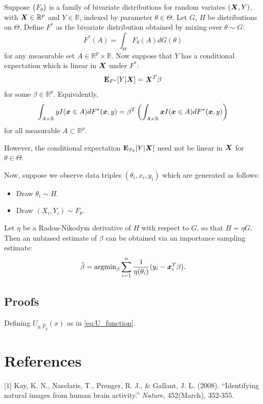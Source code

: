 \documentclass[12pt]{article}
\begin{document}
Suppose $\{F_\theta\}$ is a family of bivariate distributions for
random variates $(\boldsymbol{X}, Y)$, with $\boldsymbol{X} \in \mathbb{R}^p$ and
$Y \in \mathbb{R}$, indexed by parameter $\theta \in \Theta.$ Let $G$,
$H$ be distributions on $\Theta$.  Define $F^*$ as the bivariate
distribution obtained by mixing over $\theta \sim G$:
\[
F^*(A) = \int_\Theta F_\theta(A) dG(\theta)
\]
for any measurable set $A \in \mathbb{R}^p \times \mathbb{R}$.  Now
suppose that $Y$ has a conditional expectation which is linear in
$\boldsymbol{X}$ under $F^*$:
\[
\textbf{E}_{F^*}[Y|\boldsymbol{X}] = \boldsymbol{X}^T \beta
\]
for some $\beta \in \mathbb{R}^p$.
Equivalently,
\[
\int_{A \times \mathbb{R}} y I(\boldsymbol{x} \in A) dF^*(\boldsymbol{x}, y) = \beta^T \left(\int_{A \times \mathbb{R}} \boldsymbol{x} I(\boldsymbol{x} \in A) dF^*(\boldsymbol{x}, y)\right)
\]
for all measurable $A \subset \mathbb{R}^p$.

However, the conditional expectation $\textbf{E}_{F_\theta}[Y|\boldsymbol{X}]$ need not
be linear in $\boldsymbol{X}$ for $\theta \in \Theta$.

Now, suppose we observe data
triples $(\theta_i, x_i, y_i)$ which are generated as follows:
\begin{itemize}
\item Draw $\theta_i \sim H$.
\item Draw $(X_i, Y_i) \sim F_\theta$.
\end{itemize}
Let $\eta$ be a Radon-Nikodym derivative of $H$ with respect to $G$, so that $H = \eta G$.
Then an unbiased estimate of $\beta$ can be obtained via an importance sampling estimate:
\[
\hat{\beta} = \text{argmin}_\beta \sum_{i=1}^n \frac{1}{\eta(\theta_i)} (y_i - \boldsymbol{x}_i^T \beta).
\]

\subsection{Proofs}

\begin{lemma}\label{lemma:U_function}
Defining $U_{y,\hat{F}_y}(x)$ as in \eqref{eq:U_function}.
\end{lemma}



\section*{References}

\small

[1] Kay, K. N., Naselaris, T., Prenger, R. J., \& Gallant, J. L. (2008). ``Identifying natural images from human brain activity.'' 
\emph{Nature}, 452(March), 352-355.
\end{document}

